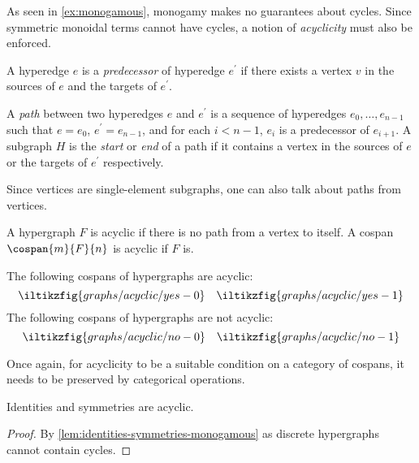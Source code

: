 As seen in \cref{ex:monogamous}, monogamy makes no guarantees about cycles.
Since symmetric monoidal terms cannot have cycles, a notion of \emph{acyclicity}
must also be enforced.

\begin{definition}
    A hyperedge \(e\) is a \emph{predecessor} of hyperedge \(e^\prime\)
    if there exists a vertex \(v\) in the sources of \(e\) and the targets of
    \(e^\prime\).
\end{definition}

\begin{definition}
    A \emph{path} between two hyperedges \(e\) and \(e^\prime\) is a sequence of
    hyperedges \(e_0, \dots, e_{n-1}\) such that \(e = e_0\),
    \(e^\prime = e_{n-1}\), and for each \(i < n-1\), \(e_i\) is a predecessor
    of \(e_{i+1}\).
    A subgraph \(H\) is the \emph{start} or \emph{end} of a path if it contains
    a vertex in the sources of \(e\) or the targets of \(e^\prime\) respectively.
\end{definition}

Since vertices are single-element subgraphs, one can also talk about paths from
vertices.

\begin{definition}
    A hypergraph \(F\) is acyclic if there is no path from a vertex to itself.
    A cospan \(\cospan{m}{F}{n}\) is acyclic if \(F\) is.
\end{definition}

\begin{example}\label{ex:acyclic}
    The following cospans of hypergraphs are acyclic:
    \[
        \iltikzfig{graphs/acyclic/yes-0}
        \quad
        \iltikzfig{graphs/acyclic/yes-1}
    \]
    The following cospans of hypergraphs are not acyclic:
    \[
        \iltikzfig{graphs/acyclic/no-0}
        \quad
        \iltikzfig{graphs/acyclic/no-1}
    \]
\end{example}

Once again, for acyclicity to be a suitable condition on a category of cospans,
it needs to be preserved by categorical operations.

\begin{lemma}\label{lem:identities-symmetries-monogamous-acyclic}
    Identities and symmetries are acyclic.
\end{lemma}
\begin{proof}
    By \cref{lem:identities-symmetries-monogamous} as discrete
    hypergraphs cannot contain cycles.
\end{proof}

